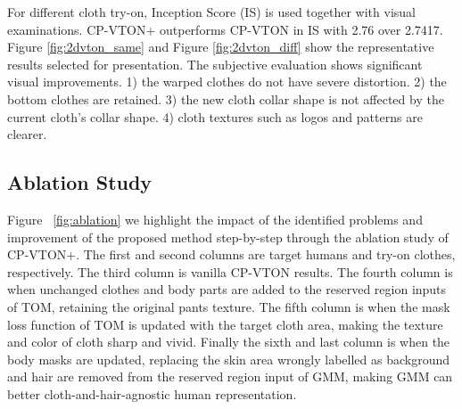  For different cloth try-on, Inception Score (IS) is used together with visual examinations. CP-VTON+ outperforms CP-VTON in IS with 2.76 over 2.7417. Figure \ref{fig:2dvton_same} and Figure \ref{fig:2dvton_diff} show the representative results selected for presentation. The subjective evaluation shows significant visual improvements.  1) the warped clothes do not have severe distortion. 2) the bottom clothes are retained. 3) the new cloth collar shape is not affected by the current cloth's collar shape. 4) cloth textures such as logos and patterns are clearer.
 
 



\subsection{Ablation Study}

Figure ~\ref{fig:ablation} we highlight the impact of the identified problems and improvement of the proposed method step-by-step through the ablation study of CP-VTON+. The first and second columns are target humans and try-on clothes, respectively. The third column is vanilla CP-VTON results. The fourth column is when unchanged clothes and body parts are added to the reserved region inputs of TOM, retaining the original pants texture. The fifth column is when the mask loss function of TOM is updated with the target cloth area, making the texture and color of cloth sharp and vivid. Finally the sixth and last column is when the body masks are updated, replacing the skin area wrongly labelled as background and hair are removed from the reserved region input of GMM, making GMM can better cloth-and-hair-agnostic human representation.  



